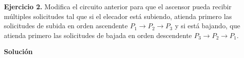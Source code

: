 \textbf{Ejercicio 2.} Modifica el circuito anterior para que el ascensor pueda 
recibir múltiples solicitudes tal que si el elecador está subiendo, atienda primero 
las solicitudes de subida en orden ascendente $P_1 \rightarrow P_2 \rightarrow P_3$ y 
si está bajando, que atienda primero las solicitudes de bajada en orden descendente 
$P_3 \rightarrow P_2 \rightarrow P_1$.

\textbf{Solución}

\newpage